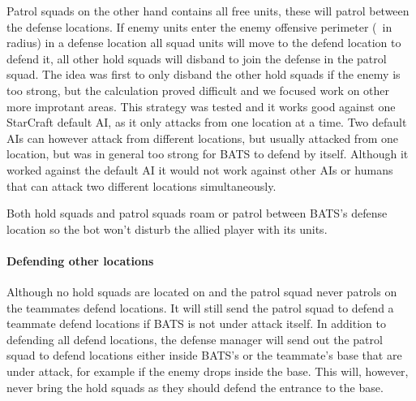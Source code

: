 Patrol squads on the other hand contains all free units, these will patrol between the defense locations. If enemy units enter the enemy offensive perimeter (\squadDefendEnemyOffensivePerimeter~in radius) in a defense location all squad units will move to the defend location to defend it, all other hold squads will disband to join the defense in the patrol squad. The idea was first to only disband the other hold squads if the enemy is too strong, but the calculation proved difficult and we focused work on other more improtant areas. This strategy was tested and it works good against one StarCraft default AI, as it only attacks from one location at a time. Two default AIs can however attack from different locations, but usually attacked from one location, but was in general too strong for BATS to defend by itself. Although it worked against the default AI it would not work against other AIs or humans that can attack two different locations simultaneously.


Both hold squads and patrol squads roam or patrol between BATS’s defense location so the bot won’t disturb the allied player with its units.

\paragraph{Defending other locations}
Although no hold squads are located on and the patrol squad never patrols on the teammates defend locations. It will still send the patrol squad to defend a teammate defend locations if BATS is not under attack itself. In addition to defending all defend locations, the defense manager will send out the patrol squad to defend locations either inside BATS’s or the teammate's base that are under attack, for example if the enemy drops inside the base. This will, however, never bring the hold squads as they should defend the entrance to the base.